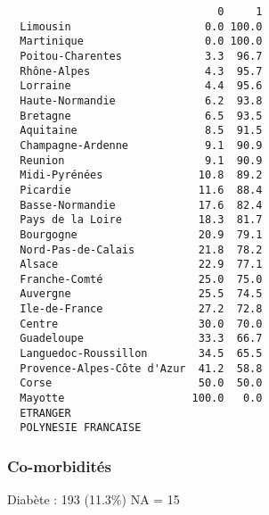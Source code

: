 \documentclass[11pt,a4paper]{article}\usepackage[]{graphicx}\usepackage[]{color}
\makeatletter
\newenvironment{kframe}{%
 \def\at@end@of@kframe{}%
 \ifinner\ifhmode%
  \def\at@end@of@kframe{\end{minipage}}%
  \begin{minipage}{\columnwidth}%
 \fi\fi%
 \def\FrameCommand##1{\hskip\@totalleftmargin \hskip-\fboxsep
 \colorbox{shadecolor}{##1}\hskip-\fboxsep
     \hskip-\linewidth \hskip-\@totalleftmargin \hskip\columnwidth}%
 \MakeFramed {\advance\hsize-\width
   \@totalleftmargin\z@ \linewidth\hsize
   \@setminipage}}%
 {\par\unskip\endMakeFramed%
 \at@end@of@kframe}
\newenvironment{knitrout}{}{} %
\makeatother
\begin{document}
\begin{knitrout}
\begin{kframe}
\begin{verbatim}
                                 0     1
  Limousin                     0.0 100.0
  Martinique                   0.0 100.0
  Poitou-Charentes             3.3  96.7
  Rhône-Alpes                  4.3  95.7
  Lorraine                     4.4  95.6
  Haute-Normandie              6.2  93.8
  Bretagne                     6.5  93.5
  Aquitaine                    8.5  91.5
  Champagne-Ardenne            9.1  90.9
  Reunion                      9.1  90.9
  Midi-Pyrénées               10.8  89.2
  Picardie                    11.6  88.4
  Basse-Normandie             17.6  82.4
  Pays de la Loire            18.3  81.7
  Bourgogne                   20.9  79.1
  Nord-Pas-de-Calais          21.8  78.2
  Alsace                      22.9  77.1
  Franche-Comté               25.0  75.0
  Auvergne                    25.5  74.5
  Ile-de-France               27.2  72.8
  Centre                      30.0  70.0
  Guadeloupe                  33.3  66.7
  Languedoc-Roussillon        34.5  65.5
  Provence-Alpes-Côte d'Azur  41.2  58.8
  Corse                       50.0  50.0
  Mayotte                    100.0   0.0
  ETRANGER                              
  POLYNESIE FRANCAISE                   
\end{verbatim}
\end{kframe}
\end{knitrout}


      \subsubsection{Co-morbidités}

Diabète : 193 (11.3\%) NA = 15
\end{document}

